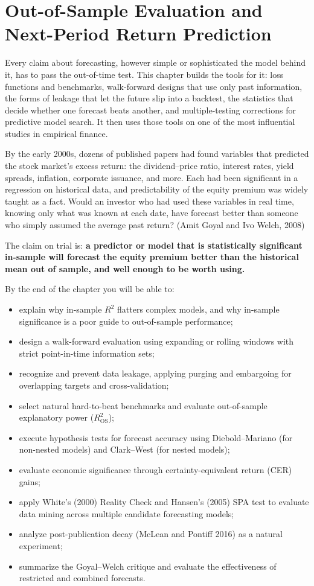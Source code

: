 \chapter{Out-of-Sample Evaluation and Next-Period Return Prediction}
\label{ch:05}

Every claim about forecasting, however simple or sophisticated the model behind it, has to pass the out-of-time test. This chapter builds the tools for it: loss functions and benchmarks, walk-forward designs that use only past information, the forms of leakage that let the future slip into a backtest, the statistics that decide whether one forecast beats another, and multiple-testing corrections for predictive model search. It then uses those tools on one of the most influential studies in empirical finance.

By the early 2000s, dozens of published papers had found variables that predicted the stock market's excess return: the dividend--price ratio, interest rates, yield spreads, inflation, corporate issuance, and more. Each had been significant in a regression on historical data, and predictability of the equity premium was widely taught as a fact. Would an investor who had used these variables in real time, knowing only what was known at each date, have forecast better than someone who simply assumed the average past return? (Amit Goyal and Ivo Welch, 2008)

The claim on trial is: \textbf{a predictor or model that is statistically significant in-sample will forecast the equity premium better than the historical mean out of sample, and well enough to be worth using.}

By the end of the chapter you will be able to:
\begin{itemize}
  \item explain why in-sample $R^2$ flatters complex models, and why in-sample significance is a poor guide to out-of-sample performance;
  \item design a walk-forward evaluation using expanding or rolling windows with strict point-in-time information sets;
  \item recognize and prevent data leakage, applying purging and embargoing for overlapping targets and cross-validation;
  \item select natural hard-to-beat benchmarks and evaluate out-of-sample explanatory power ($R^2_{\text{OS}}$);
  \item execute hypothesis tests for forecast accuracy using Diebold--Mariano (for non-nested models) and Clark--West (for nested models);
  \item evaluate economic significance through certainty-equivalent return (CER) gains;
  \item apply White's (2000) Reality Check and Hansen's (2005) SPA test to evaluate data mining across multiple candidate forecasting models;
  \item analyze post-publication decay (McLean and Pontiff 2016) as a natural experiment;
  \item summarize the Goyal--Welch critique and evaluate the effectiveness of restricted and combined forecasts.
\end{itemize}

